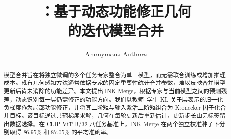 \documentclass{article}
\title{\normalfont\bfseries \method{}：基于动态功能修正几何\\的迭代模型合并}
\author{Anonymous Authors}
\providecommand{\inkbibliography}{references}
\newcommand{\method}{INK-Merge}
\begin{document}
\maketitle

\begin{abstract}
模型合并旨在将独立微调的多个任务专家整合为单一模型，而无需联合训练或增加推理成本。现有几何感知方法通常依据专家的固定重要性统计合并参数，难以反映合并模型更新后尚未消除的功能差异。本文提出 \method{}，根据专家与当前模型之间的预测残差，动态识别每一层仍需修正的功能方向。我们以教师--学生 KL 关于层表示的归一化负梯度作为局部功能修正，并将其二阶矩与输入激活二阶矩组合为 Kronecker 因子化合并目标。该目标通过共轭梯度求解，几何在每轮更新后重新估计，更新步长由无标签留出数据选择。在 CLIP ViT-B/32 八任务基准上，\method{} 在两个独立校准种子下分别取得 $86.95\%$ 和 $87.05\%$ 的平均准确率。
\end{abstract}


\clearpage
\raggedbottom



\FloatBarrier
\flushbottom
\suppressfloats[t]



\FloatBarrier







\appendix

\end{document}
